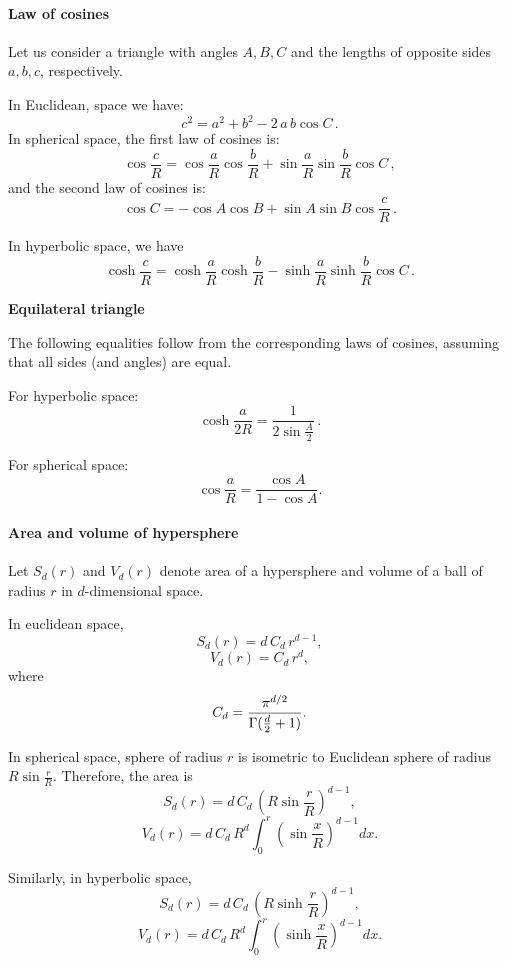 \documentclass{article} %
\begin{document}
\paragraph{Law of cosines}

Let us consider a triangle with angles $A, B, C$ and the lengths of opposite sides $a, b, c$, respectively.

In Euclidean, space we have:
\[
c^2 = a^2 + b^2 - 2 \, a\, b \cos C\,.
\]
In spherical space, the first law of cosines is:
\[
\cos \frac{c}{R} =\cos \frac{a}{R} \cos \frac{b}{R} + \sin \frac{a}{R}\sin \frac{b}{R}\cos C \,,
\]
and the second law of cosines is:
\[
\cos C=-\cos A\cos B+\sin A\sin B\cos \frac{c}{R}\,.
\]

In hyperbolic space, we have 
\[
\cosh {\frac {c}{R}}= \cosh {\frac {a}{R}}\cosh {\frac {b}{R}}-\sinh {\frac {a}{R}}\sinh {\frac {b}{R}}\cos C \,.
\]

\textbf{Equilateral triangle}

The following equalities follow from the corresponding laws of cosines, assuming that all sides (and angles) are equal.

For hyperbolic space:
\begin{equation}\label{eq:hyp_eq}
\cosh\frac{a}{2R} = \frac{1}{2\sin \frac{A}{2}}\,.
\end{equation}

For spherical space:
\begin{equation}\label{eq:sph_eq}
\cos{\frac{a}{R}} = \frac{\cos A}{1 - \cos A}.
\end{equation}

\paragraph{Area and volume of hypersphere}

Let $S_d(r)$ and $V_d(r)$ denote area of a hypersphere and volume of a ball of radius $r$ in $d$-dimensional space. 

In euclidean space,
\[
S_d(r)= d \, C_{d} \, r^{d-1},
\]
\[
V_d(r)= C_{d} \, r^{d},
\]
where
\[
C_{d}={\frac  {\pi ^{{d/2}}}{\Gamma ({d \over 2}+1)}}.
\]

In spherical space, sphere of radius $r$ is isometric to Euclidean sphere of radius $R \sin \frac{r}{R}$. Therefore, the area is 
\[
S_d(r)= d \, C_{d} \, \left( R \sin \frac{r}{R} \right)^{d-1},
\]
\[
V_d(r)= d \, C_{d} \, R^d \int_{0}^{r} \left( \sin \frac{x}{R} \right)^{d-1} d x .
\]

Similarly, in hyperbolic space,
\[
S_d(r)= d \, C_{d} \, \left( R \sinh \frac{r}{R} \right)^{d-1},
\]
\[
V_d(r)= d \, C_{d} \, R^d \int_{0}^{r} \left( \sinh \frac{x}{R} \right)^{d-1} d x .
\]
\end{document}
